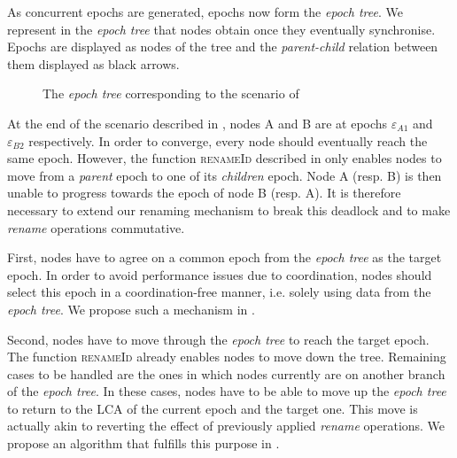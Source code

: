 \documentclass[10pt,journal,compsoc]{IEEEtran}
\let\MYoriglatexcaption\caption
\renewcommand{\caption}[2][\relax]{\MYoriglatexcaption[#2]{#2}}
\newcommand{\ie}{i.e. }
\newcommand{\epoch}[1]{$\varepsilon_{#1}$}
\begin{document}
As concurrent epochs are generated, epochs now form the \emph{epoch tree}.
We represent in  the \emph{epoch tree} that nodes obtain once they eventually synchronise.
Epochs are displayed as nodes of the tree and the \emph{parent-child} relation between them displayed as black arrows.

\begin{figure}[!ht]
    \centering
    \caption{The \emph{epoch tree} corresponding to the scenario of \Cref{fig:conflicting-rename-operations}}
    \label{fig:epoch-tree}
\end{figure}

At the end of the scenario described in , nodes A and B are at epochs \epoch{A1} and \epoch{B2} respectively.
In order to converge, every node should eventually reach the same epoch.
However, the function \textsc{renameId} described in  only enables nodes to move from a \emph{parent} epoch to one of its \emph{children} epoch.
Node A (resp. B) is then unable to progress towards the epoch of node B (resp. A).
It is therefore necessary to extend our renaming mechanism to break this deadlock and to make \emph{rename} operations commutative.

First, nodes have to agree on a common epoch from the \emph{epoch tree} as the target epoch.
In order to avoid performance issues due to coordination, nodes should select this epoch in a coordination-free manner, \ie solely using data from the \emph{epoch tree}.
We propose such a mechanism in .

Second, nodes have to move through the \emph{epoch tree} to reach the target epoch.
The function \textsc{renameId} already enables nodes to move down the tree.
Remaining cases to be handled are the ones in which nodes currently are on another branch of the \emph{epoch tree}.
In these cases, nodes have to be able to move up the \emph{epoch tree} to return to the \ac{LCA} of the current epoch and the target one.
This move is actually akin to reverting the effect of previously applied \emph{rename} operations.
We propose an algorithm that fulfills this purpose in .
\end{document}
